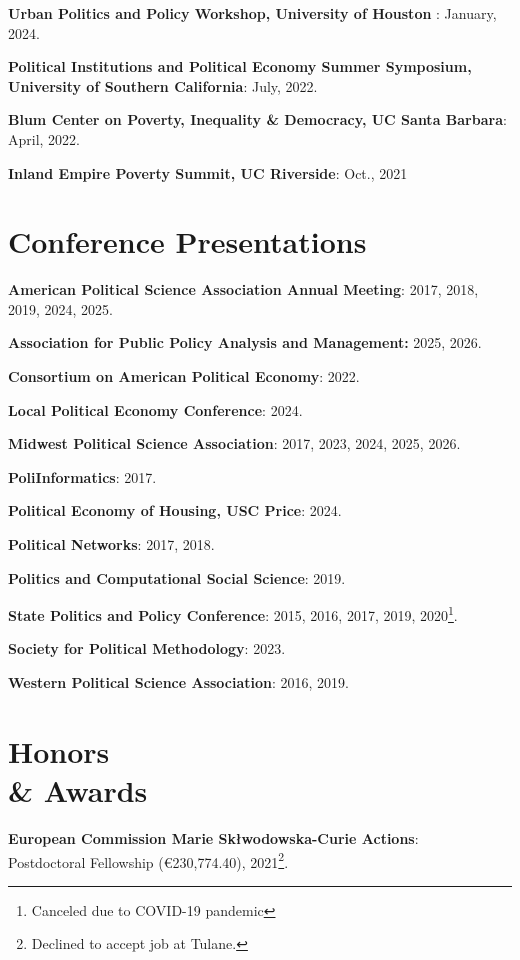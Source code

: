 \documentclass[margin,line]{res}
\begin{document}
\begin{resume}
{\bf Urban Politics and Policy Workshop, University of Houston }: January, 2024. 

{\bf Political Institutions and Political Economy Summer Symposium, University of Southern California}: July, 2022.

{\bf Blum Center on Poverty, Inequality \& Democracy, UC Santa Barbara}: April, 2022.

{\bf Inland Empire Poverty Summit, UC Riverside}: Oct., 2021
 


\section{\sc Conference Presentations} 
\vspace*{.1in}

{\bf American Political Science Association Annual Meeting}: 2017, 2018, 2019, 2024, 2025.

{\bf Association for Public Policy Analysis and Management:} 2025, 2026.

{\bf Consortium on American Political Economy}: 2022.

{\bf Local Political Economy Conference}: 2024. 

{\bf Midwest Political Science Association}: 2017, 2023, 2024, 2025, 2026. 

{\bf PoliInformatics}: 2017.

{\bf Political Economy of Housing, USC Price}: 2024.

{\bf Political Networks}: 2017, 2018.

{\bf Politics and Computational Social Science}: 2019.

{\bf State Politics and Policy Conference}: 2015, 2016, 2017, 2019, 2020\footnote{Canceled due to COVID-19 pandemic}.

{\bf Society for Political Methodology}: 2023. 

{\bf Western Political Science Association}: 2016, 2019.


\section{\sc Honors\\ \& Awards} 
\vspace*{.1in}

{\bf European Commission Marie Skłwodowska-Curie Actions}:\\ Postdoctoral Fellowship (€230,774.40),  2021\footnote{Declined to accept job at Tulane.}. 


\end{resume}
\end{document}
